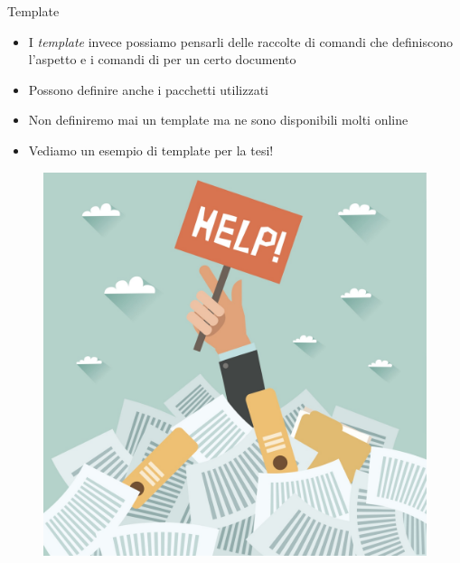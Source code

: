 \begin{frame}{Template}

\begin{itemize}
\item I \emph{template} invece possiamo pensarli delle raccolte di comandi che
definiscono l'aspetto e i comandi di per un certo documento
\item Possono definire anche i pacchetti utilizzati
\item Non definiremo mai un template ma ne sono disponibili molti online
\item Vediamo un esempio di template per la tesi!
\end{itemize}

\begin{figure}
	\centering
	\includegraphics[scale=0.20]{res/images/template}
\end{figure}

\end{frame}